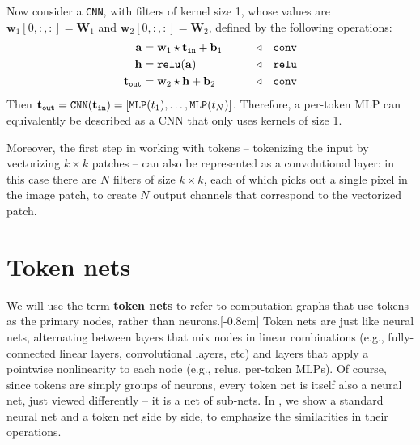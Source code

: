 Now consider a \texttt{CNN}, with filters of kernel size 1, whose values are $\mathbf{w}_1[0,:,:] = \mathbf{W}_1$ and $\mathbf{w}_2[0,:,:] = \mathbf{W}_2$, defined by the following operations:
\begin{align}
    \mathbf{a} &= \mathbf{w}_1 \star \mathbf{t}_{\texttt{in}} + \mathbf{b}_1 &\quad\quad \triangleleft \quad \texttt{conv}\\
    \mathbf{h} &= \texttt{relu}(\mathbf{a}) &\quad\quad \triangleleft \quad \texttt{relu}\\
    \mathbf{t}_{\texttt{out}} &= \mathbf{w}_2 \star \mathbf{h} + \mathbf{b}_2 &\quad\quad \triangleleft \quad \texttt{conv}
\end{align}
Then $\mathbf{t}_{\texttt{out}} = \texttt{CNN}(\mathbf{t}_{\texttt{in}}) = [\texttt{MLP}(t_1), \ldots, \texttt{MLP}(t_N)]$. Therefore, a per-token MLP can equivalently be described as a CNN that only uses kernels of size 1.

Moreover, the first step in working with tokens -- tokenizing the input by vectorizing $k \times k$ patches -- can also be represented as a convolutional layer: in this case there are $N$ filters of size $k \times k$, each of which picks out a single pixel in the image patch, to create $N$ output channels that correspond to the vectorized patch.%

\section{Token nets}

We will use the term \textbf{token nets} to refer to computation graphs that use tokens as the primary nodes, rather than neurons.[-0.8cm] Token nets are just like neural nets, alternating between layers that mix nodes in linear combinations (e.g., fully-connected linear layers, convolutional layers, etc) and layers that apply a pointwise nonlinearity to each node (e.g., relus, per-token MLPs). Of course, since tokens are simply groups of neurons, every token net is itself also a neural net, just viewed differently -- it is a net of sub-nets. In \fig{\ref{fig:transformers:neural_nets_vs_token_nets}}, we show a standard neural net and a token net side by side, to emphasize the similarities in their operations.

